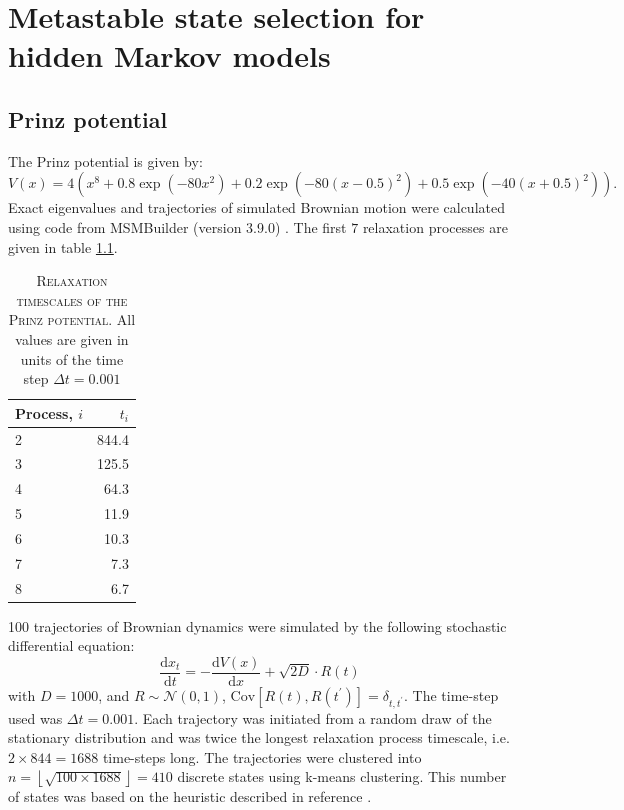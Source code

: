\chapter{Metastable state selection for hidden Markov models}\label{app:hmm}

\section{Prinz potential}

 The Prinz potential is given by: 
\begin{equation}\label{eqn:prinz_pot}
 V(x) = 4\left(x^8 + 0.8 \exp{\left(-80 x^2\right)} + 0.2 \exp{\left(-80 (x-0.5)^2\right)} + 0.5\exp{\left(-40 (x+0.5)^2\right)}\right).
\end{equation}
Exact eigenvalues and trajectories of simulated Brownian motion were calculated using code from MSMBuilder (version 3.9.0)\cite{beauchampMSMBuilder2ModelingConformational2011} . The first $7$ relaxation processes are given in table \ref{tab:prinz_its_exact}. 
\begin{table}
 \centering
 \caption[Relaxation timescales of the Prinz potential]{\textsc{Relaxation timescales of the Prinz potential}. All values are given in units of the time step $\Delta t = 0.001$}
 \begin{tabular}{lr}
 \toprule
 Process, $i$ & $t_i$ \\
 \midrule
  2 & 844.4 \\
  3 & 125.5 \\
  4 & 64.3 \\
  5 & 11.9 \\
  6 & 10.3 \\
  7 & 7.3 \\
  8 & 6.7 \\
  \bottomrule
 \end{tabular}
 \label{tab:prinz_its_exact}
\end{table}

\num{100} trajectories of Brownian dynamics were simulated by the following stochastic differential equation: 
\begin{equation}\label{eqn:prinz_dynamics}
 \frac{\mathrm{d}x_t}{\mathrm{d}t} = -\frac{\mathrm{d}V(x)}{\mathrm{d}x} + \sqrt{2D}\cdot R(t)
\end{equation}
with $D = 1000$, and $R\sim \mathcal{N}(0, 1)$, $\mathrm{Cov}\left[R(t), R(t^{\prime})\right]=\delta_{t, t^{\prime}}$. The time-step used was $\Delta t = 0.001$. Each trajectory was initiated from a random draw of the stationary distribution and was twice the longest relaxation process timescale, i.e. $2\times 844=1688$ time-steps long. The trajectories were clustered into $n = \left\lfloor\sqrt{100\times 1688}\right\rfloor =410$ discrete states using k-means clustering\cite{friedman2001elements}. This number of states was based on the heuristic described in reference \cite{husicWardClusteringImproves2017a}.


